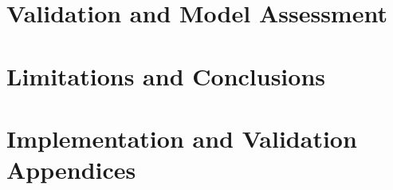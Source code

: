 \clearpage
\part{Validation and Model Assessment}






\clearpage
\part{Limitations and Conclusions}



\appendix
\clearpage
\part{Implementation and Validation Appendices}









\clearpage

